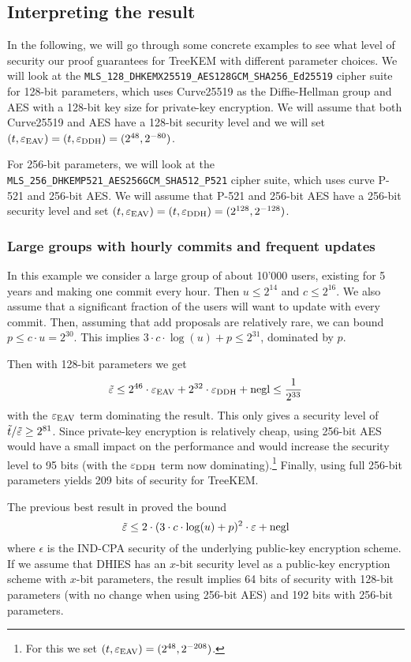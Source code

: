 \subsection{Interpreting the result}

In the following, we will go through some concrete examples to see what level of security our proof guarantees for TreeKEM with different parameter choices. We will look at the \texttt{MLS\_128\_DHKEMX25519\_AES128GCM\_SHA256\_Ed25519} cipher suite \cite[Section~17.1]{rfc9420} for 128-bit parameters, which uses Curve25519 as the Diffie-Hellman group and AES with a 128-bit key size for private-key encryption. We will assume that both Curve25519 and AES have a 128-bit security level and we will set $(t, \varepsilon_\mathrm{EAV}) = (t, \varepsilon_\mathrm{DDH}) = (2^{48}, 2^{-80})$.

For 256-bit parameters, we will look at the \texttt{MLS\_256\_DHKEMP521\_AES256GCM\_SHA512\_P521} cipher suite, which uses curve P-521 and 256-bit AES. We will assume that P-521 and 256-bit AES have a 256-bit security level and set $(t, \varepsilon_\mathrm{EAV}) = (t, \varepsilon_\mathrm{DDH}) = (2^{128}, 2^{-128})$.

\subsubsection{Large groups with hourly commits and frequent updates}

In this example we consider a large group of about 10'000 users, existing for 5 years and making one commit every hour. Then $u \le 2^{14}$ and $c \le 2^{16}$. We also assume that a significant fraction of the users will want to update with every commit. Then, assuming that add proposals are relatively rare, we can bound $p \le c \cdot u = 2^{30}$. This implies $3 \cdot c \cdot \log(u) + p \le 2^{31}$, dominated by $p$.

Then with 128-bit parameters we get
\[
	\tilde{\varepsilon} \le 2^{46} \cdot \varepsilon_\mathrm{EAV} + 2^{32} \cdot \varepsilon_\mathrm{DDH} + \mathrm{negl} \le \frac{1}{2^{33}}
\]
with the $\varepsilon_\mathrm{EAV}$ term dominating the result. This only gives a security level of $\tilde{t}/\tilde{\varepsilon} \ge 2^{81}$. Since private-key encryption is relatively cheap, using 256-bit AES would have a small impact on the performance and would increase the security level to 95 bits (with the $\varepsilon_\mathrm{DDH}$ term now dominating).\footnote{For this we set $(t, \varepsilon_\mathrm{EAV}) = (2^{48}, 2^{-208})$.} Finally, using full 256-bit parameters yields 209 bits of security for TreeKEM.

The previous best result in \cite[Theorem 3]{ttkem} proved the bound
\[
	\tilde{\varepsilon} \le 2 \cdot (3 \cdot c \cdot \log(u) + p)^2 \cdot \varepsilon + \mathrm{negl}
\]
where $\epsilon$ is the IND-CPA security of the underlying public-key encryption scheme. If we assume that DHIES has an $x$-bit security level as a public-key encryption scheme with $x$-bit parameters, the result implies 64 bits of security with 128-bit parameters (with no change when using 256-bit AES) and 192 bits with 256-bit parameters.

